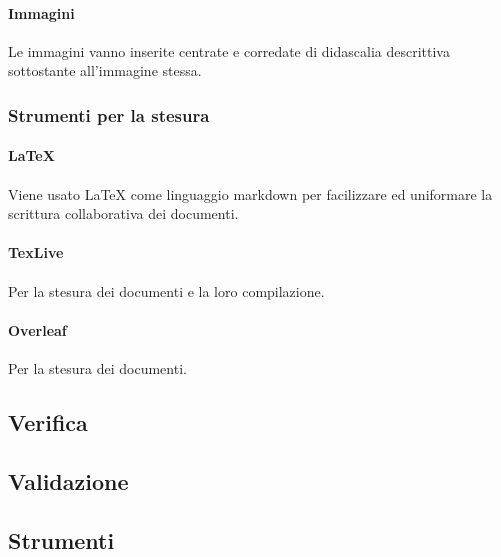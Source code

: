 	    \paragraph{Immagini}
	    Le immagini vanno inserite centrate e corredate di didascalia descrittiva sottostante all'immagine stessa.
	    \subsubsection{Strumenti per la stesura}
	    \paragraph{LaTeX}
	    Viene usato LaTeX come linguaggio markdown per facilizzare ed uniformare la scrittura collaborativa dei documenti.
	    \paragraph{TexLive}
	    Per la stesura dei documenti e la loro compilazione.
	    \paragraph{Overleaf}
	    Per la stesura dei documenti.
	\subsection{Verifica}
	\subsection{Validazione}
	\subsection{Strumenti}
